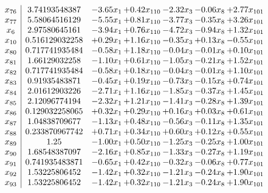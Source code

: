 \documentclass[8pt]{article}
\begin{document}
\[\begin{array}{c| c c@{\hskip 2pt} c@{\hskip 2pt} c@{\hskip 2pt} c@{\hskip 2pt} c@{\hskip 2pt} }
 x_{76}   &  3.74193548387 & -3.65 x_{1} & +  0.42 x_{110} & -2.32 x_{3} & -0.06 x_{8} & +  2.77 x_{101}\\
 x_{77}   &  5.58064516129 & -5.55 x_{1} & +  0.81 x_{110} & -3.77 x_{3} & -0.35 x_{8} & +  3.26 x_{101}\\
 x_{6}   &  2.97580645161 & -3.94 x_{1} & +  0.76 x_{110} & -4.72 x_{3} & -0.94 x_{8} & +  1.32 x_{101}\\
 x_{10}   &  0.516129032258 & +  0.29 x_{1} & +  1.16 x_{110} & -0.35 x_{3} & +  0.13 x_{8} & -0.55 x_{101}\\
 x_{80}   &  0.717741935484 & -0.58 x_{1} & +  1.18 x_{110} & -0.04 x_{3} & -0.01 x_{8} & +  0.10 x_{101}\\
 x_{81}   &  1.66129032258 & -1.10 x_{1} & +  0.61 x_{110} & -1.05 x_{3} & -0.21 x_{8} & +  1.52 x_{101}\\
 x_{82}   &  0.717741935484 & -0.58 x_{1} & +  0.18 x_{110} & -0.04 x_{3} & -0.01 x_{8} & +  1.10 x_{101}\\
 x_{83}   &  0.91935483871 & -0.45 x_{1} & +  0.19 x_{110} & -0.73 x_{3} & -0.15 x_{8} & +  0.74 x_{101}\\
 x_{84}   &  2.01612903226 & -2.71 x_{1} & +  1.16 x_{110} & -1.85 x_{3} & -0.37 x_{8} & +  1.45 x_{101}\\
 x_{85}   &  2.12096774194 & -2.32 x_{1} & +  1.21 x_{110} & -1.41 x_{3} & -0.28 x_{8} & +  1.39 x_{101}\\
 x_{86}   &  0.129032258065 & +  0.32 x_{1} & +  0.29 x_{110} & +  0.16 x_{3} & +  0.03 x_{8} & +  0.61 x_{101}\\
 x_{87}   &  1.04838709677 & -1.13 x_{1} & +  0.48 x_{110} & -0.56 x_{3} & -0.11 x_{8} & +  1.35 x_{101}\\
 x_{88}   &  0.233870967742 & +  0.71 x_{1} & +  0.34 x_{110} & +  0.60 x_{3} & +  0.12 x_{8} & +  0.55 x_{101}\\
 x_{89}   &  1.25 & -1.00 x_{1} & +  0.50 x_{110} & -1.25 x_{3} & -0.25 x_{8} & +  1.00 x_{101}\\
 x_{90}   &  1.68548387097 & -2.16 x_{1} & +  0.85 x_{110} & -1.33 x_{3} & -0.27 x_{8} & +  1.19 x_{101}\\
 x_{91}   &  0.741935483871 & -0.65 x_{1} & +  0.42 x_{110} & -0.32 x_{3} & -0.06 x_{8} & +  0.77 x_{101}\\
 x_{92}   &  1.53225806452 & -1.42 x_{1} & +  0.32 x_{110} & -1.21 x_{3} & -0.24 x_{8} & +  1.90 x_{101}\\
 x_{93}   &  1.53225806452 & -1.42 x_{1} & +  0.32 x_{110} & -1.21 x_{3} & -0.24 x_{8} & +  1.90 x_{101}\\

\end{array}\]
\end{document}
